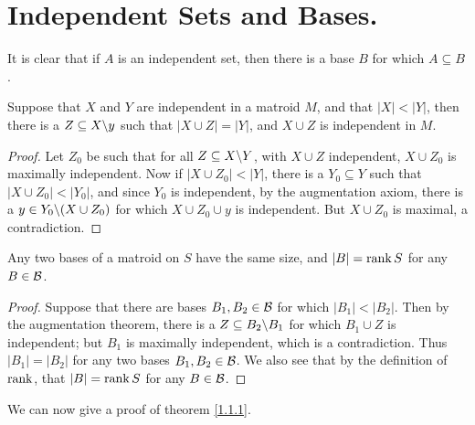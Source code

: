 
\section{Independent Sets and Bases.}

It is clear that if $A$ is an independent set, then there is a base  $B$ for which  $A \subseteq B$.

\begin{theorem}\label{1.4.1}
    Suppose that $X$ and $Y$ are independent in a matroid $M$, and that $|X|<|Y|$, then there is a
    $Z \subseteq X\backslash y$ such that $|X \cup Z|=|Y|$, and $X \cup Z$ is independent in $M$.
\end{theorem}
\begin{proof}
    Let $Z_0$ be such that for all $Z \subseteq X\backslash Y$, with $X \cup Z$ independent,  $X \cup
    Z_0$ is maximally independent. Now if $|X \cup Z_0|<|Y|$, there is a $Y_0 \subseteq Y$ such 
    that $|X \cup Z_0|<|Y_0|$, and since $ Y_0$ is independent, by the augmentation axiom, 
    there is a $y \in Y_0\backslash(X \cup Z_0)$ for which $X \cup Z_0 \cup y$ is independent. 
    But $X \cup Z_0$ is maximal, a contradiction.
\end{proof}
\begin{corollary}
    Any two bases of a matroid on  $S$ have the same size, and  $|B|=\operatorname{rank}{S}$ for any $B \in \mathcal{B}$.
\end{corollary}
\begin{proof}
    Suppose that there are bases $ B_1,B_2 \in \mathcal{B}$ for which $|B_1|<|B_2|$. Then by the
    augmentation theorem, there is a $Z \subseteq B_2\backslash B_1$ for which $ B_1 \cup Z$ is
    independent; but $ B_1$ is maximally independent, which is a contradiction. Thus $|B_1|=|B_2|$
    for any two bases $ B_1,B_2 \in \mathcal{B}$. We also see that by the definition of $\operatorname{rank}$, that
    $|B|=\operatorname{rank}{S}$ for any $B \in \mathcal{B}$.
\end{proof}

We can now give a proof of theorem \ref{1.1.1}.


